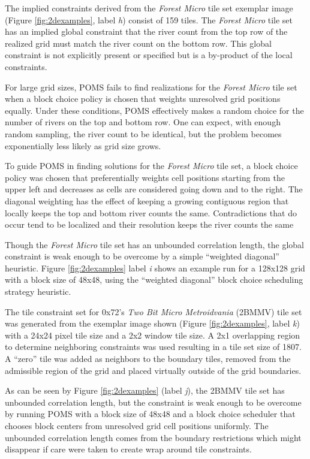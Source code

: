 The implied constraints derived from the \textit{Forest Micro} tile set exemplar image (Figure \ref{fig:2dexamples}, label \textit{h}) consist of 159 tiles.
The \textit{Forest Micro} tile set has an implied global constraint that the river count from the top row of the realized
grid must match the river count on the bottom row.
This global constraint is not explicitly present or specified but is a by-product of the local constraints.

For large grid sizes, POMS fails to find realizations for the \textit{Forest Micro} tile set when a block
choice policy is chosen that weights unresolved grid positions equally.
Under these conditions, POMS effectively makes a random choice for the number of rivers on the top and bottom row.
One can expect, with enough random sampling, the river count to be identical, but the problem
becomes exponentially less likely as grid size grows.

To guide POMS in finding solutions for the \textit{Forest Micro} tile set, a
block choice policy was chosen that preferentially weights cell positions starting from the upper left and decreases as
cells are considered going down and to the right.
The diagonal weighting has the effect of keeping a growing contiguous region that locally keeps the top and bottom
river counts the same.
Contradictions that do occur tend to be localized and their resolution keeps the river counts the same

Though the \textit{Forest Micro} tile set has an unbounded correlation length, the global constraint is weak enough
to be overcome by a simple ``weighted diagonal'' heuristic.
Figure \ref{fig:2dexamples} label \textit{i} shows an example run for a 128x128 grid with a block size of 48x48, using
the ``weighted diagonal'' block choice scheduling strategy heuristic.

The tile constraint set for 0x72's \textit{Two Bit Micro Metroidvania} (2BMMV) tile set was
generated from the exemplar image shown (Figure \ref{fig:2dexamples}, label \textit{k}) with a 24x24 pixel tile size and a 2x2 window tile size.
A 2x1 overlapping region to determine neighboring constraints was used resulting in a tile set size of 1807.
A ``zero'' tile was added as neighbors to the boundary tiles, removed from
the admissible region of the grid and placed virtually outside of the grid boundaries.

As can be seen by Figure \ref{fig:2dexamples} (label \textit{j}), the 2BMMV tile set has unbounded correlation length, but the constraint is weak
enough to be overcome by running POMS with a block size of 48x48 and a block choice scheduler that chooses block centers from
unresolved grid cell positions uniformly.
The unbounded correlation length comes from the boundary restrictions which might disappear if care were taken
to create wrap around tile constraints.

